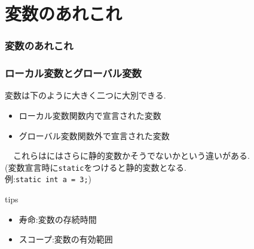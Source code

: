 \documentclass[dvipdfmx]{beamer}
\begin{document}
\section{変数のあれこれ}
\begin{frame}[label=51]
    \frametitle{変数のあれこれ}
    \tableofcontents[sections={2,9}]
    \vfill \hfill 
    \hyperlink{50}{}
    \space
    \hyperlink{52}{}
\end{frame}
\begin{frame}[c, fragile, label=52]
    \frametitle{ローカル変数とグローバル変数}
    変数は下のように大きく二つに大別できる.
    \begin{itemize}
        \item ローカル変数\qquad 関数内で宣言された変数
        \item グローバル変数\qquad 関数外で宣言された変数
    \end{itemize}
    　これらはにはさらに静的変数かそうでないかという違いがある.\\
    (変数宣言時に\texttt{static}をつけると静的変数となる.\\
    \qquad 例:\space \texttt{static int a = 3;})
    \begin{itembox}[l]{tips}
        \begin{itemize}
            \item 寿命:変数の存続時間
            \item スコープ:変数の有効範囲
        \end{itemize}
    \end{itembox}
    \vfill \hfill 
    \hyperlink{51}{}
    \space
    \hyperlink{53}{}
\end{frame}
\end{document}

